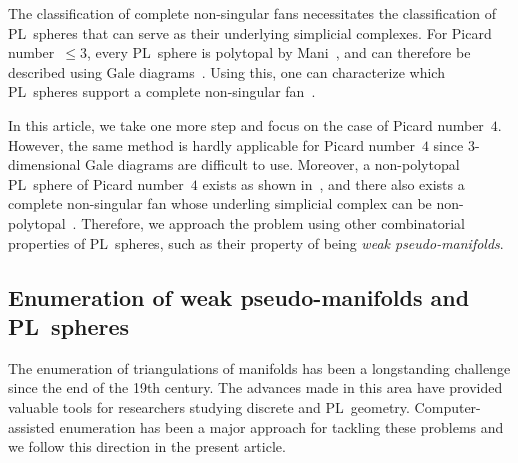 \documentclass[11pt]{amsart}
\theoremstyle{plain}
\numberwithin{equation}{section}
\theoremstyle{definition}
\begin{document}
The classification of complete non-singular fans necessitates the classification of PL~spheres that can serve as their underlying simplicial complexes.
For Picard number~$\leq 3$, every PL~sphere is polytopal by Mani~\cite{Mani1972}, and can therefore be described using Gale diagrams~\cite{Grunbaum2003}.
Using this, one can characterize which PL~spheres support a complete non-singular fan~\cite{Gretenkort-Kleinschmidt-Sturmfels1990,Erokhovets2011}.

In this article, we take one more step and focus on the case of Picard number~$4$.
However, the same method is hardly applicable for Picard number~$4$ since $3$-dimensional Gale diagrams are difficult to use.
Moreover, a non-polytopal PL~sphere of Picard number~$4$ exists as shown in~\cite{Grunbaum-Sreedharan1967}, and there also exists a complete non-singular fan whose underling simplicial complex can be non-polytopal~\cite{Suyama2014}.
Therefore, we approach the problem using other combinatorial properties of PL~spheres, such as their property of being \emph{weak pseudo-manifolds}.

\subsection*{Enumeration of weak pseudo-manifolds and PL~spheres}
The enumeration of triangulations of manifolds has been a longstanding challenge since the end of the 19th century. The advances made in this area have provided valuable tools for researchers studying discrete and PL~geometry. Computer-assisted enumeration has been a major approach for tackling these problems and we follow this direction in the present article.
\end{document}
